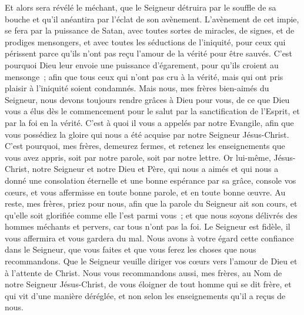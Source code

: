 \begin{multicols}{2}
Et alors sera révélé le méchant, que le Seigneur détruira par le souffle de sa bouche et qu'il anéantira par l'éclat de son avènement.
L'avènement de cet impie, se fera par la puissance de Satan, avec toutes sortes de miracles, de signes, et de prodiges mensongers,
et avec toutes les séductions de l'iniquité, pour ceux qui périssent parce qu'ils n'ont pas reçu l'amour de la vérité pour être sauvés.
C'est pourquoi Dieu leur envoie une puissance d'égarement, pour qu'ils croient au mensonge~;
afin que tous ceux qui n'ont pas cru à la vérité, mais qui ont pris plaisir à l'iniquité soient condamnés.
Mais nous, mes frères bien-aimés du Seigneur, nous devons toujours rendre grâces à Dieu pour vous, de ce que Dieu vous a élus dès le commencement pour le salut par la sanctification de l'Esprit, et par la foi en la vérité.
C'est à quoi il vous a appelés par notre Evangile, afin que vous possédiez la gloire qui nous a été acquise par notre Seigneur Jésus-Christ.
C'est pourquoi, mes frères, demeurez fermes, et retenez les enseignements que vous avez appris, soit par notre parole, soit par notre lettre.
Or lui-même, Jésus-Christ, notre Seigneur et notre Dieu et Père, qui nous a aimés et qui nous a donné une consolation éternelle et une bonne espérance par sa grâce,
console vos cœurs, et vous affermisse en toute bonne parole, et en toute bonne œuvre.
\VerseOne{}Au reste, mes frères, priez pour nous, afin que la parole du Seigneur ait son cours, et qu'elle soit glorifiée comme elle l'est parmi vous~;
et que nous soyons délivrés des hommes méchants et pervers, car tous n'ont pas la foi.
Le Seigneur est fidèle, il vous affermira et vous gardera du mal.
Nous avons à votre égard cette confiance dans le Seigneur, que vous faites et que vous ferez les choses que nous recommandons.
Que le Seigneur veuille diriger vos cœurs vers l'amour de Dieu et à l'attente de Christ.
Nous vous recommandons aussi, mes frères, au Nom de notre Seigneur Jésus-Christ, de vous éloigner de tout homme qui se dit frère, et qui vit d'une manière déréglée, et non selon les enseignements qu'il a reçus de nous.

\end{multicols}
